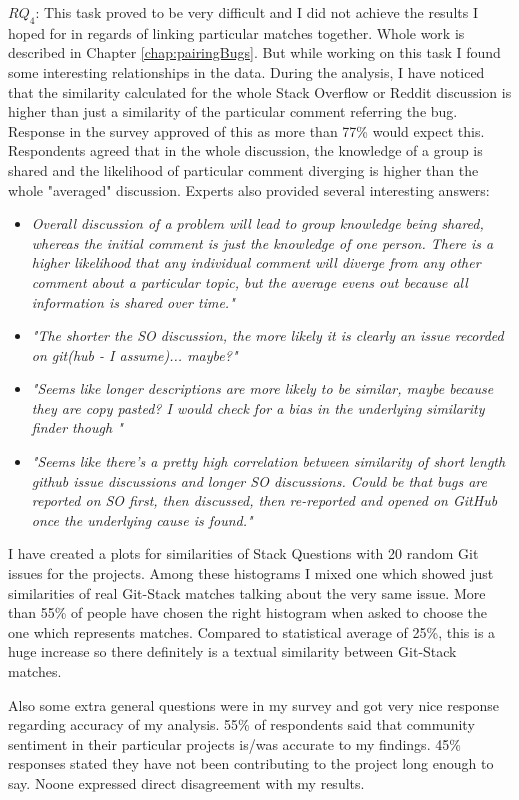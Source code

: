 \textbf{$RQ_{4}$}: This task proved to be very difficult and I did not achieve the results I hoped for in regards of linking particular matches together. Whole work is described in Chapter \ref{chap:pairingBugs}. But while working on this task I found some interesting relationships in the data. During the analysis, I have noticed that the similarity calculated for the whole Stack Overflow or Reddit discussion is higher than just a similarity of the particular comment referring the bug. Response in the survey approved of this as more than 77\% would expect this. Respondents agreed that in the whole discussion, the knowledge of a group is shared and the likelihood of particular comment diverging is higher than the whole "averaged" discussion. Experts also provided several interesting answers:
\begin{itemize}
\item \textit{Overall discussion of a problem will lead to group knowledge being shared, whereas the initial comment is just the knowledge of one person. There is a higher likelihood that any individual comment will diverge from any other comment about a particular topic, but the average evens out because all information is shared over time."}
\item \textit{"The shorter the SO discussion, the more likely it is clearly an issue recorded on git(hub - I assume)... maybe?"}
\item \textit{"Seems like longer descriptions are more likely to be similar, maybe because they are copy pasted? I would check for a bias in the underlying similarity finder though
"}
\item \textit{"Seems like there's a pretty high correlation between similarity of short length github issue discussions and longer SO discussions. Could be that bugs are reported on SO first, then discussed, then re-reported and opened on GitHub once the underlying cause is found."}
\end{itemize} I have created a plots for similarities of Stack Questions with 20 random Git issues for the projects. Among these histograms I mixed one which showed just similarities of real Git-Stack matches talking about the very same issue. More than 55\% of people have chosen the right histogram when asked to choose the one which represents matches. Compared to statistical average of 25\%, this is a huge increase so there definitely is a textual similarity between Git-Stack matches.


Also some extra general questions were in my survey and got very nice response regarding accuracy of my analysis. 55\% of respondents said that community sentiment in their particular projects is/was accurate to my findings. 45\% responses stated they have not been contributing to the project long enough to say. Noone expressed direct disagreement with my results.
